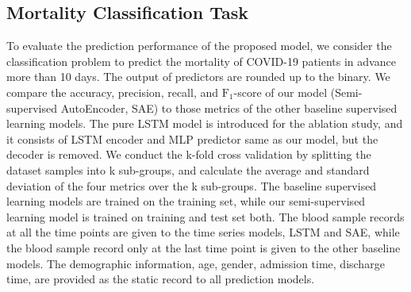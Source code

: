 \subsection{Mortality Classification Task}
To evaluate the prediction performance of the proposed model, we consider the classification problem to predict the mortality of COVID-19 patients in advance more than 10 days. The output of predictors are rounded up to the binary. We compare the accuracy, precision, recall, and $\text{F}_1$-score of our model (Semi-supervised AutoEncoder, SAE) to those metrics of the other baseline supervised learning models. The pure LSTM model is introduced for the ablation study, and it consists of LSTM encoder and MLP predictor same as our model, but the decoder is removed. We conduct the k-fold cross validation by splitting the dataset samples into k sub-groups, and calculate the average and standard deviation of the four metrics over the k sub-groups. The baseline supervised learning models are trained on the training set, while our semi-supervised learning model is trained on training and test set both. The blood sample records at all the time points are given to  the time series models, LSTM and SAE, while the blood sample record only at the last time point is given to the other baseline models. The demographic information, age, gender, admission time, discharge time, are provided as the static record to all prediction models.
